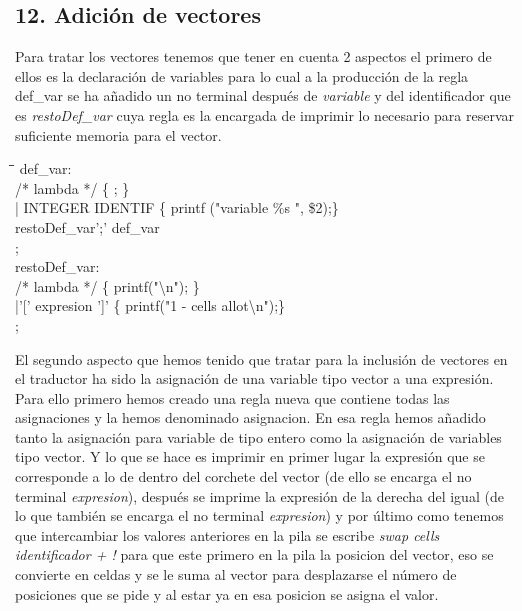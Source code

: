 \documentclass[11pt,spanish]{article}
\begin{document}
		\subsection*{12. Adición de vectores}
		\label{subsec:12}
		Para tratar los vectores tenemos que tener en cuenta 2 aspectos el primero de ellos es la declaración de variables para lo cual a la producción de la regla {\ttfamily def\_var} se ha añadido un no terminal después de \textit {variable} y del identificador que es \textit {restoDef\_var} cuya regla es la encargada de imprimir lo necesario para reservar suficiente memoria para el vector.
		\begin{tcolorbox}
		\begin{tabbing}
			\hspace*{1cm}\=\hspace*{1cm}\= \hspace*{4cm}\=\kill
			def\_var:   \\		   
				\> /* lambda */\> \>		\{ ; \}\\
				 \>| INTEGER IDENTIF\> \> \{ printf ("variable \%s ", \$2);\} \\
				 \>\>restoDef\_var';' def\_var\\
			 ;\\
			 
			restoDef\_var:\\
					\> /* lambda */ \> \>		\{ printf("\textbackslash n"); \} \\
					\>|'[' expresion ']'\> \>	\{ printf("1 - cells allot\textbackslash n");\} \\
			;
		\end{tabbing}
		\end{tcolorbox}
		El segundo aspecto que hemos tenido que tratar para la inclusión de vectores en el traductor ha sido la asignación de una variable tipo vector a una expresión. Para ello primero hemos creado una regla nueva que contiene todas las asignaciones y la hemos denominado {\ttfamily asignacion}. En esa regla hemos añadido tanto la asignación para variable de tipo entero como la asignación de variables tipo vector. Y lo que se hace es imprimir en primer lugar la expresión que se corresponde a lo de dentro del corchete del vector (de ello se encarga el no terminal \textit {expresion}), después se imprime la expresión de la derecha del igual (de lo que también se encarga el no terminal \textit {expresion}) y por último como tenemos que intercambiar los valores anteriores en la pila se escribe \textit{swap cells identificador + !} para que este primero en la pila la posicion del vector, eso se convierte en celdas y se le suma al vector para desplazarse el número de posiciones que se pide y al estar ya en esa posicion se asigna el valor.
\end{document}
